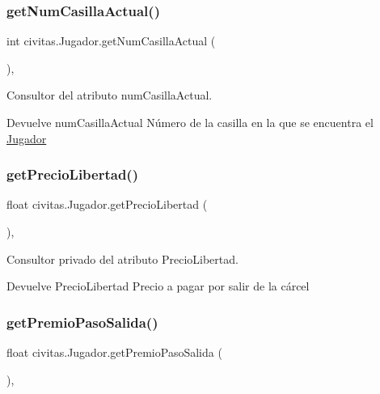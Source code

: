\subsubsection{\texorpdfstring{get\+Num\+Casilla\+Actual()}{getNumCasillaActual()}}
{\footnotesize\ttfamily int civitas.\+Jugador.\+get\+Num\+Casilla\+Actual (\begin{DoxyParamCaption}{ }\end{DoxyParamCaption})\hspace{0.3cm}{\ttfamily [inline]}, {\ttfamily [package]}}

Consultor del atributo num\+Casilla\+Actual. \begin{DoxyReturn}{Devuelve}
num\+Casilla\+Actual Número de la casilla en la que se encuentra el \hyperlink{classcivitas_1_1Jugador}{Jugador} 
\end{DoxyReturn}
\mbox{\label{classcivitas_1_1Jugador_a7efefdcbd0fc0d10e113a605c0251e2b}} 
\subsubsection{\texorpdfstring{get\+Precio\+Libertad()}{getPrecioLibertad()}}
{\footnotesize\ttfamily float civitas.\+Jugador.\+get\+Precio\+Libertad (\begin{DoxyParamCaption}{ }\end{DoxyParamCaption})\hspace{0.3cm}{\ttfamily [inline]}, {\ttfamily [private]}}

Consultor privado del atributo Precio\+Libertad. \begin{DoxyReturn}{Devuelve}
Precio\+Libertad Precio a pagar por salir de la cárcel 
\end{DoxyReturn}
\mbox{\label{classcivitas_1_1Jugador_a2640c1b6ddf6f07a2d11012b51f05910}} 
\subsubsection{\texorpdfstring{get\+Premio\+Paso\+Salida()}{getPremioPasoSalida()}}
{\footnotesize\ttfamily float civitas.\+Jugador.\+get\+Premio\+Paso\+Salida (\begin{DoxyParamCaption}{ }\end{DoxyParamCaption})\hspace{0.3cm}{\ttfamily [inline]}, {\ttfamily [private]}}

